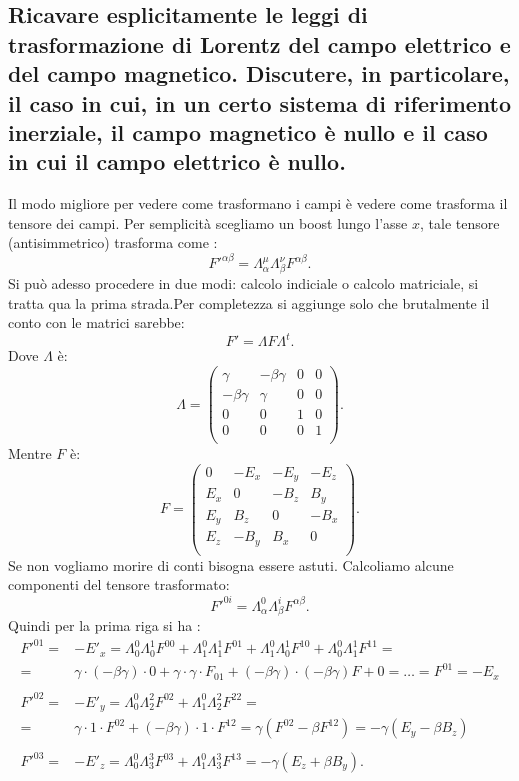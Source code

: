 \subsection[]{Ricavare esplicitamente le leggi di trasformazione di Lorentz del campo elettrico e del campo magnetico. Discutere, in particolare, il caso in cui, in un certo sistema di riferimento inerziale, il campo magnetico è nullo e il caso in cui il campo elettrico è nullo.}
\label{sec:3.b.4}
Il modo migliore per vedere come trasformano i campi è vedere come trasforma il tensore dei campi. Per semplicità scegliamo un boost lungo l'asse $x$, tale tensore (antisimmetrico) trasforma come :
\[
	F'^{\alpha\beta}= \Lambda^{\mu}_{\alpha} \Lambda^{\nu}_{\beta} F^{\alpha\beta}
.\] 
Si può adesso procedere in due modi: calcolo indiciale o calcolo matriciale, si tratta qua la prima strada.Per completezza si aggiunge solo che brutalmente il conto con le matrici sarebbe:\[
	F'=\Lambda F \Lambda^{t}
.\] 
Dove $\Lambda$ è:
\[
	\Lambda = 
	\left( 
	\begin{array}{cccc}
		\gamma & -\beta\gamma & 0 & 0 \\   
		-\beta\gamma & \gamma & 0 & 0 \\
		0 & 0 & 1 & 0 \\
		0 & 0 & 0 & 1 \\
	\end{array}
	\right) 
.\]
Mentre $F$ è:
\[
	F = 
	\left( 
	\begin{array}{c|ccc}
		0 & -E_{x} & -E_{y} & -E_{z} \\   
		\hline
		E_{x} & 0 & -B_{z} & B_{y} \\
		E_{y} & B_{z} & 0 & -B_{x} \\
		E_{z} & -B_{y} & B_{x} & 0 \\
	\end{array}
	\right) 
.\] 
Se non vogliamo morire di conti bisogna essere astuti. Calcoliamo alcune componenti del tensore trasformato: \[
	F'^{0i}=\Lambda^{0}_{\alpha}\Lambda^{i}_{\beta}F^{\alpha\beta}
.\] 
Quindi per la prima riga si ha : 
\begin{align*}
	F'^{01}=& -E'_{x}= \Lambda^{0}_{0}\Lambda^{1}_{0}F^{00} + \Lambda^{0}_{1}\Lambda^{1}_{1}F^{01} + 
		\Lambda^{0}_{1}\Lambda^{1}_{0}F^{10} + \Lambda^{0}_{0}\Lambda^{1}_{1}F^{11}=\\
		=&\gamma\cdot \left( -\beta\gamma \right) \cdot 0 + \gamma \cdot \gamma \cdot F_{01} +
		\left( - \beta\gamma \right) \cdot \left( -\beta\gamma \right) F + 0 = \ldots = F^{01} = -E_{x}\\ 
		 & \\
	F'^{02}=&-E'_{y}= \Lambda^{0}_{0}\Lambda^2_2 F^{02} + \Lambda^0_1\Lambda^2_2 F^{22}=\\
		=&\gamma\cdot 1\cdot F^{02}+\left(-\beta\gamma\right)\cdot 1\cdot F^{12}=\gamma\left(F^{02}-\beta F^{12}\right)=-\gamma\left(E_{y}-\beta B_{z}\right)\\
		& \\
	F'^{03}=&-E'_{z}=\Lambda^{0}_{0}\Lambda^{3}_{3}F^{03}+\Lambda^{0}_{1}\Lambda^{3}_{3}F^{13}= -\gamma\left( E_{z}+\beta B_{y} \right) 
.\end{align*}
